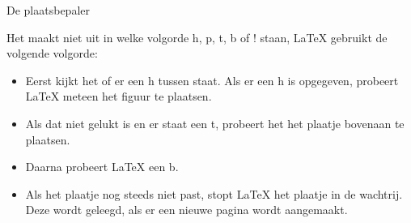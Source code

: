 \documentclass{cursuspresentatie}
\begin{document}
\begin{frame}[allowframebreaks]{De plaatsbepaler}
	
	
	
	Het maakt niet uit in welke volgorde h, p, t, b of ! staan, \LaTeX{} gebruikt de volgende volgorde: 
	\begin{itemize}
		\item Eerst kijkt het of er een h tussen staat. Als er een h is opgegeven, probeert \LaTeX{} meteen het figuur te plaatsen.
		\item Als dat niet gelukt is en er staat een t, probeert het het plaatje bovenaan te plaatsen.
		\item Daarna probeert \LaTeX{} een b.
		\item Als het plaatje nog steeds niet past, stopt \LaTeX{} het plaatje in de wachtrij. Deze wordt geleegd, als er een nieuwe pagina wordt aangemaakt.
	\end{itemize}
	\framebreak
	

\end{frame}
\end{document}
